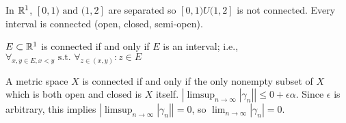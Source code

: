 \begin{example}
	In $\mathbb{R}^{1}$, $[0,1) \text{ and }  (1,2]$ are separated so $[0,1) U (1,2]$ is not connected. Every interval is connected (open, closed, semi-open).
\end{example}

\begin{thm}[47]
	$E \subset \mathbb{R}^{1}$ is connected if and only if $E$ is an interval; i.e., $\forall_{x,y \in E,x<y} \text{ s.t. }  \forall_{z \in (x,y)}:z \in E $
\end{thm}

\begin{thm}
	A metric space $X$ is connected if and only if the only nonempty subset of $X$ which is both open and closed is $X$ itself.
	$|\limsup_{n\to \infty}{|\gamma_n|}|\le 0+\epsilon \alpha$. Since $\epsilon$ is arbitrary, this implies $|\limsup_{n\to \infty}{|\gamma_n|}|=0$, so $\lim_{n\to \infty}{|\gamma_n|}=0$.
\end{thm}

